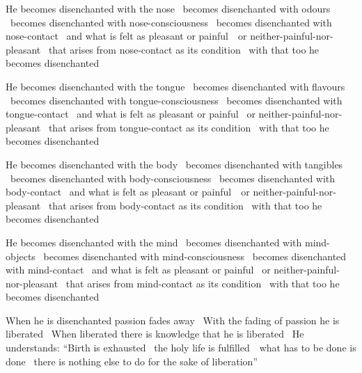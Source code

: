 \begin{english-only-hang}
  He becomes disenchanted with the nose \breathmark\ becomes disenchanted with odours \breathmark\ becomes disenchanted with nose-consciousness \breathmark\ becomes disenchanted with nose-contact \breathmark\ and what is felt as pleasant or \mbox{painful}~\breathmark\ or neither-painful-nor-pleasant \breathmark\ that arises from nose-contact as its condition \breathmark\ with that too he becomes disenchanted
\end{english-only-hang}

\begin{english-only-hang}
  He becomes disenchanted with the tongue \breathmark\ becomes disenchanted with flavours \breathmark\ becomes disenchanted with tongue-consciousness \breathmark\ becomes disenchanted with tongue-contact \breathmark\ and what is felt as pleasant or painful \breathmark\ or neither-painful-nor-pleasant \breathmark\ that arises from tongue-contact as its condition \breathmark\ with that too he becomes disenchanted
\end{english-only-hang}

\begin{english-only-hang}
  He becomes disenchanted with the body \breathmark\ becomes disenchanted with tangibles \breathmark\ becomes disenchanted with body-consciousness \breathmark\ becomes disenchanted with body-contact \breathmark\ and what is felt as pleasant or \mbox{painful}~\breathmark\ or neither-painful-nor-pleasant \breathmark\ that arises from body-contact as its condition \breathmark\ with that too he becomes disenchanted
\end{english-only-hang}

\begin{english-only-hang}
  He becomes disenchanted with the mind \breathmark\ becomes disenchanted with mind-objects \breathmark\ becomes disenchanted with mind-consciousness \breathmark\ becomes disenchanted with mind-contact \breathmark\ and what is felt as pleasant or painful \breathmark\ or neither-painful-nor-pleasant \breathmark\ that arises from mind-contact as its condition \breathmark\ with that too he becomes disenchanted
\end{english-only-hang}

\begin{english-only-hang}
  When he is disenchanted passion fades away \breathmark\ With the fading of passion he is liberated \breathmark\ When liberated there is knowledge that he is liberated \breathmark\ He understands: ``Birth is exhausted \breathmark\ the holy life is \mbox{fulfilled}~\breathmark\ what has to be done is done \breathmark\ there is nothing else to do for the sake of liberation''
\end{english-only-hang}

